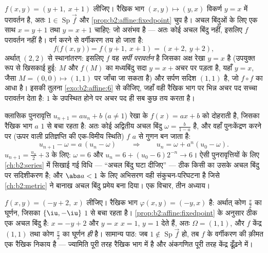 \begin{example}[एक सर्पी परावर्तन, रंगे हाथ पकड़ा हुआ]\label{ex:b2:affine:glide}
$f(x, y) = (y + 1,\ x + 1)$ लीजिए। रैखिक भाग $(x, y)
\mapsto (y, x)$ विकर्ण $y = x$ में परावर्तन है, अतः $1 \in \operatorname{Sp}\vec f$ और \cref{prop:b2:affine:fixedpoint} चुप
है। अचल बिंदुओं के लिए एक साथ $x = y + 1$ तथा $y = x + 1$ चाहिए: जो असंभव है --- अतः कोई
अचल बिंदु नहीं, इसलिए $f$ परावर्तन नहीं है। वर्ग करने से वर्गीकरण तय हो
जाता है:
\[
f\bigl(f(x, y)\bigr) = f(y + 1,\ x + 1) = (x + 2,\ y + 2),
\]
अर्थात् $(2, 2)$ से स्थानांतरण: इसलिए $f$ वह \emph{सर्पी परावर्तन} है जिसका
अक्ष रेखा $y = x$ है (उपयुक्त रूप से खिसकाई हुई: $M$ और $f(M)$ का मध्यबिंदु
सदा $y = x + {}$अचर पर पड़ता है, यहाँ $y = x$, जैसा $M = (0,
0) \mapsto (1,1)$ पर जाँचा जा सकता है) और
सर्पण सदिश $(1, 1)$ है, जो $f
\circ f$ का आधा है। इसकी तुलना \cref{exo:b2:affine:6} से कीजिए, जहाँ वही
रैखिक भाग पर भिन्न अचर पद सच्चा परावर्तन देता है:  $1$ के
उपस्थित होने पर अचर पद ही सब कुछ तय करता है।
\end{example}

\begin{example}\label{ex:b2:affine:recursion}
क्लासिक पुनरावृत्ति $u_{n+1} = au_n + b$ ($a \neq 1$) रेखा के  $f(x) = ax + b$ को दोहराती है,
जिसका रैखिक भाग $a$  $1$ से बचा रहता है: अतः कोई अद्वितीय
अचल बिंदु $\omega = \frac{b}{1-a}$ है, और वहाँ पुनःकेंद्रण करने पर (ऊपर वाली प्रतिज्ञप्ति की
एक-विमीय स्थिति) $f$ $a$ से गुणन बन जाता है:
\[
u_{n+1} - \omega = a\,(u_n - \omega)
\qquad\Longrightarrow\qquad
u_n = \omega + a^n(u_0 - \omega) .
\]
$u_{n+1} = \frac{u_n}2 + 3$ के लिए: $\omega = 6$ और $u_n = 6 +
(u_0 - 6)2^{-n} \to 6$। ऐसी पुनरावृत्तियों के लिए \cref{ch:b2:series} में सिखाई गई
विधि --- ``अचल बिंदु घटा दीजिए'' --- ठीक किसी  का उसके अचल
बिंदु पर सदिशीकरण है; और $\abs a < 1$ के लिए अभिसरण वही संकुचन-परिघटना है जिसे \cref{ch:b2:metric}
ने बानाख अचल बिंदु प्रमेय बना दिया। एक विचार, तीन अध्याय।
\end{example}

\begin{example}[किसी घूर्णन का केंद्र ढूँढ़ना]\label{ex:b2:affine:rotationcenter}
$f(x, y) = (-y + 2,\ x)$ लीजिए। रैखिक भाग $\varphi(x, y) = (-y, x)$ है: अर्थात् कोण $\frac\pi2$ का घूर्णन, जिसका  $\{\iu, -\iu\}$
$1$ से बचा रहता है। \cref{prop:b2:affine:fixedpoint} के अनुसार ठीक एक अचल बिंदु है: $x = -y + 2$ और $y = x$ $x = 1$,
$y = 1$ देते हैं, अतः $\Omega = (1, 1)$, और $f$ केंद्र $(1, 1)$ तथा कोण $\frac\pi2$ का घूर्णन
\emph{ही} है। सामान्य पाठ: जब $1
\notin \operatorname{Sp}\vec f$ हो, तब $f$ के वर्गीकरण की क़ीमत एक
रैखिक निकाय है --- ज्यामिति पूरी तरह रैखिक भाग में है और अंकगणित पूरी तरह
केंद्र ढूँढ़ने में।
\end{example}

